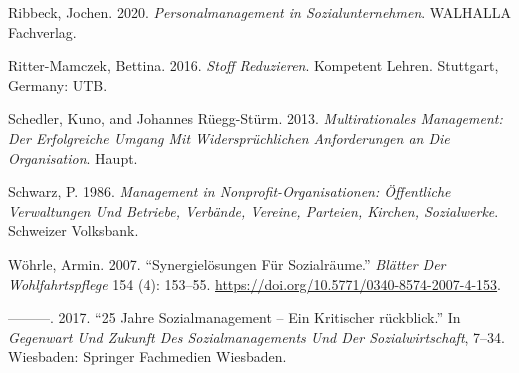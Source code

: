 \documentclass[
  letterpaper,
]{book}
\newlength{\cslhangindent}
\newenvironment{CSLReferences}[2] %
 {\begin{list}{}{%
  \setlength{\itemindent}{0pt}
  \setlength{\leftmargin}{0pt}
  \setlength{\parsep}{0pt}
  \ifodd #1
   \setlength{\leftmargin}{\cslhangindent}
   \setlength{\itemindent}{-1\cslhangindent}
  \fi
  \setlength{\itemsep}{#2\baselineskip}}}
 {\end{list}}
\begin{document}
\begin{CSLReferences}{1}{0}
Ribbeck, Jochen. 2020. \emph{Personalmanagement in Sozialunternehmen}.
WALHALLA Fachverlag.

Ritter-Mamczek, Bettina. 2016. \emph{Stoff Reduzieren}. Kompetent
Lehren. Stuttgart, Germany: UTB.

Schedler, Kuno, and Johannes Rüegg-Stürm. 2013. \emph{Multirationales
Management: Der Erfolgreiche Umgang Mit Widerspr{ü}chlichen
Anforderungen an Die Organisation}. Haupt.

Schwarz, P. 1986. \emph{Management in Nonprofit-Organisationen:
{Ö}ffentliche Verwaltungen Und Betriebe, Verb{ä}nde, Vereine, Parteien,
Kirchen, Sozialwerke}. Schweizer Volksbank.

Wöhrle, Armin. 2007. {``Synergielösungen Für Sozialräume.''}
\emph{Blätter Der Wohlfahrtspflege} 154 (4): 153--55.
\url{https://doi.org/10.5771/0340-8574-2007-4-153}.

---------. 2017. {``25 Jahre Sozialmanagement -- Ein Kritischer
r{ü}ckblick.''} In \emph{Gegenwart Und Zukunft Des Sozialmanagements Und
Der Sozialwirtschaft}, 7--34. Wiesbaden: Springer Fachmedien Wiesbaden.

\end{CSLReferences}


\backmatter
\end{document}
